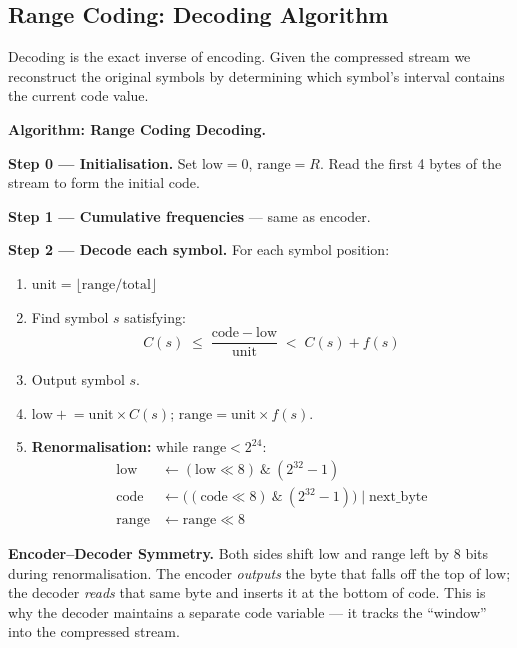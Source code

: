 \subsection{Range Coding: Decoding Algorithm}

Decoding is the exact inverse of encoding. Given the compressed stream we
reconstruct the original symbols by determining which symbol's interval
contains the current code value.

\begin{definitionbox}
\textbf{Algorithm: Range Coding Decoding.}

\textbf{Step 0 — Initialisation.}
Set $\mathrm{low} = 0$, $\mathrm{range} = R$.  Read the first 4 bytes of the
stream to form the initial $\mathrm{code}$.

\medskip
\textbf{Step 1 — Cumulative frequencies} — same as encoder.

\medskip
\textbf{Step 2 — Decode each symbol.}
For each symbol position:
\begin{enumerate}[leftmargin=2em]
    \item $\mathrm{unit} = \lfloor \mathrm{range} / \mathrm{total} \rfloor$
    \item Find symbol $s$ satisfying:
    \[
      C(s) \;\leq\; \frac{\mathrm{code} - \mathrm{low}}{\mathrm{unit}} 
      \;<\; C(s) + f(s)
    \]
    \item Output symbol $s$.
    \item $\mathrm{low} \mathrel{+}= \mathrm{unit} \times C(s)$; \quad
          $\mathrm{range} = \mathrm{unit} \times f(s)$.
    \item \textbf{Renormalisation:} while $\mathrm{range} < 2^{24}$:
    \begin{align*}
      \mathrm{low}  &\leftarrow (\mathrm{low} \ll 8)\ \&\ (2^{32}-1) \\
      \mathrm{code} &\leftarrow \bigl((\mathrm{code} \ll 8)\ \&\ 
                     (2^{32}-1)\bigr) \mid \mathrm{next\_byte} \\
      \mathrm{range}&\leftarrow \mathrm{range} \ll 8
    \end{align*}
\end{enumerate}
\end{definitionbox}

\begin{importantbox}
\textbf{Encoder–Decoder Symmetry.}
Both sides shift $\mathrm{low}$ and $\mathrm{range}$ left by 8 bits during
renormalisation. The encoder \emph{outputs} the byte that falls off the top of
$\mathrm{low}$; the decoder \emph{reads} that same byte and inserts it at the
bottom of $\mathrm{code}$.  This is why the decoder maintains a separate
$\mathrm{code}$ variable — it tracks the ``window'' into the compressed
stream.
\end{importantbox}

